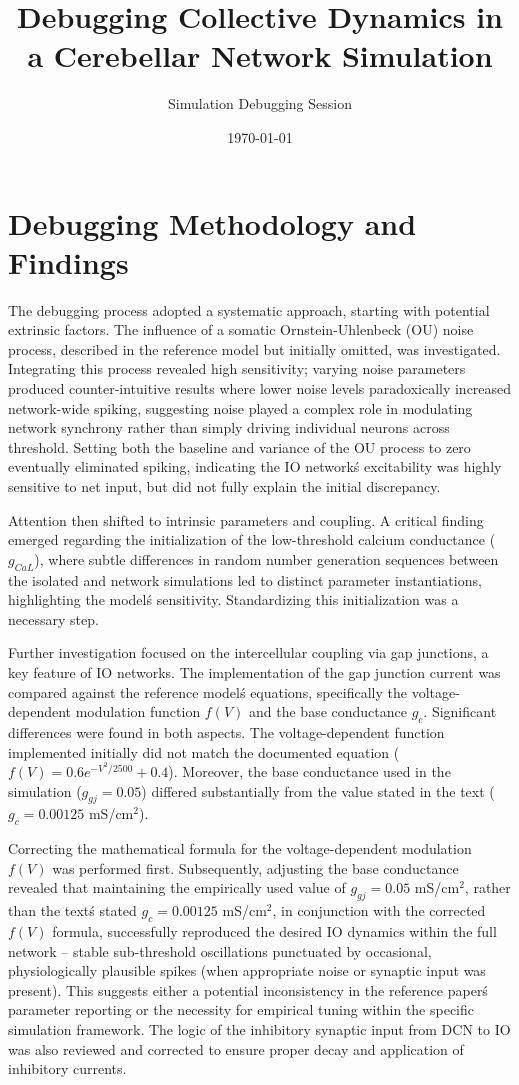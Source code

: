 \documentclass{article}
\title{Debugging Collective Dynamics in a Cerebellar Network Simulation}
\author{Simulation Debugging Session}
\date{\today}
\begin{document}
\maketitle

\section*{Debugging Methodology and Findings}
The debugging process adopted a systematic approach, starting with potential extrinsic factors. The influence of a somatic Ornstein-Uhlenbeck (OU) noise process, described in the reference model but initially omitted, was investigated. Integrating this process revealed high sensitivity; varying noise parameters produced counter-intuitive results where lower noise levels paradoxically increased network-wide spiking, suggesting noise played a complex role in modulating network synchrony rather than simply driving individual neurons across threshold. Setting both the baseline and variance of the OU process to zero eventually eliminated spiking, indicating the IO network\'s excitability was highly sensitive to net input, but did not fully explain the initial discrepancy.

Attention then shifted to intrinsic parameters and coupling. A critical finding emerged regarding the initialization of the low-threshold calcium conductance ($g_{CaL}$), where subtle differences in random number generation sequences between the isolated and network simulations led to distinct parameter instantiations, highlighting the model\'s sensitivity. Standardizing this initialization was a necessary step.

Further investigation focused on the intercellular coupling via gap junctions, a key feature of IO networks. The implementation of the gap junction current was compared against the reference model\'s equations, specifically the voltage-dependent modulation function $f(V)$ and the base conductance $g_c$. Significant differences were found in both aspects. The voltage-dependent function implemented initially did not match the documented equation ($f(V) = 0.6 e^{-V^2 / 2500} + 0.4$). Moreover, the base conductance used in the simulation ($g_{gj} = 0.05$) differed substantially from the value stated in the text ($g_c = 0.00125$ mS/cm$^2$).

Correcting the mathematical formula for the voltage-dependent modulation $f(V)$ was performed first. Subsequently, adjusting the base conductance revealed that maintaining the empirically used value of $g_{gj} = 0.05$ mS/cm$^2$, rather than the text\'s stated $g_c = 0.00125$ mS/cm$^2$, in conjunction with the corrected $f(V)$ formula, successfully reproduced the desired IO dynamics within the full network – stable sub-threshold oscillations punctuated by occasional, physiologically plausible spikes (when appropriate noise or synaptic input was present). This suggests either a potential inconsistency in the reference paper\'s parameter reporting or the necessity for empirical tuning within the specific simulation framework. The logic of the inhibitory synaptic input from DCN to IO was also reviewed and corrected to ensure proper decay and application of inhibitory currents.
\end{document}
